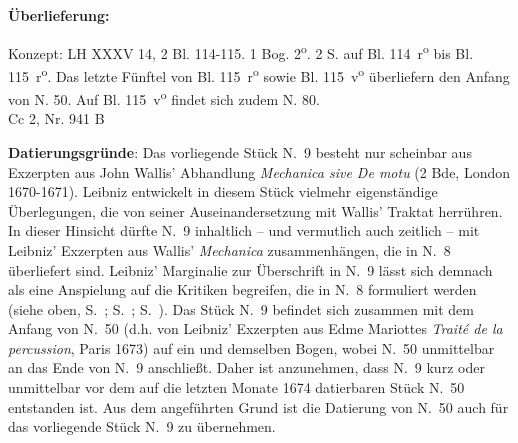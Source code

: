 \begin{ledgroupsized}[r]{120mm}
\footnotesize
\pstart
\noindent\textbf{\"{U}berlieferung:}
\pend
\end{ledgroupsized}
%
\begin{ledgroupsized}[r]{114mm}
\footnotesize
\pstart
\parindent -6mm
Konzept: LH XXXV 14, 2 Bl. 114-115. 1 Bog. 2\textsuperscript{o}. 2  S. auf Bl. 114~r\textsuperscript{o} bis Bl. 115~r\textsuperscript{o}. Das letzte Fünftel von Bl. 115~r\textsuperscript{o} sowie Bl. 115~v\textsuperscript{o} überliefern den Anfang von N. 50. Auf Bl. 115~v\textsuperscript{o} findet sich zudem N. 80.
\\Cc 2, Nr. 941 B
\pend
\end{ledgroupsized}
\vspace*{5mm}
\begin{ledgroup}
\footnotesize
\pstart
\noindent
\footnotesize{\textbf{Datierungsgr\"{u}nde}: Das vorliegende Stück N.~9 %
besteht nur scheinbar aus Exzerpten aus John Wallis' Abhandlung \cite{00301}\textit{Mechanica sive De motu} (2 Bde, London 1670-1671).
Leibniz entwickelt in diesem Stück vielmehr eigenständige Überlegungen, die von seiner Auseinandersetzung mit Wallis' Traktat herrühren.
In dieser Hinsicht dürfte N.~9 %
inhaltlich -- und vermutlich auch zeitlich -- mit Leibniz' Exzerpten aus Wallis' \textit{Mechanica} zusammenhängen,
die in N.~8 %
überliefert sind. Leibniz' Marginalie zur Überschrift in N.~9 %
lässt sich demnach als eine Anspielung auf die Kritiken begreifen, die in N.~8 %
formuliert werden (siehe oben, S.~;
S.~;
S.~).
\newline\hspace*{6mm}%
Das Stück N.~9 %
befindet sich zusammen mit dem Anfang von N.~50 %
(d.h. von Leibniz' Exzerpten aus Edme Mariottes \cite{00311}\textit{Traité de la percussion}, Paris 1673)
auf ein und demselben Bogen, wobei N.~50 %
unmittelbar an das Ende von N.~9 %
anschließt. Daher ist anzunehmen, dass N.~9 %
kurz oder unmittelbar vor dem auf die letzten Monate 1674 datierbaren Stück N.~50 %
entstanden ist.
Aus dem angeführten Grund ist die Datierung von N.~50 auch für das vorliegende Stück N.~9 %
zu übernehmen.}
\pend
\end{ledgroup}
